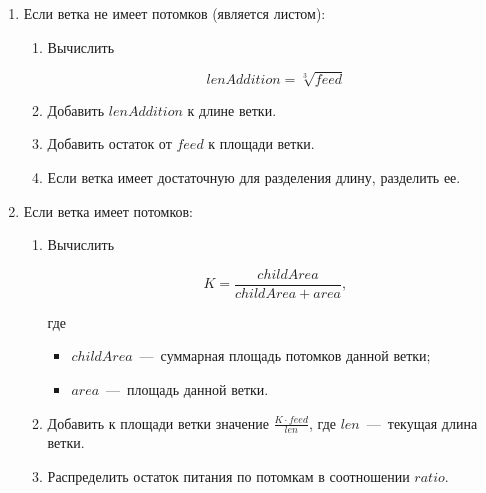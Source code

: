 \begin{enumerate}
	\item Если ветка не имеет потомков (является листом):
	\begin{enumerate}
		\item Вычислить
		
		\begin{equation}
		lenAddition = \sqrt[3]{feed}	
		\end{equation}
		
		\item Добавить $lenAddition$ к длине ветки.
		\item Добавить остаток от $feed$ к площади ветки.
		\item Если ветка имеет достаточную для разделения длину, разделить ее.

	\end{enumerate}
	
	\item Если ветка имеет потомков:
	
	\begin{enumerate}
		\item Вычислить
		
		\begin{equation}
		K = \frac{childArea}{childArea + area},
		\end{equation}
		
		где 
		
		\begin{itemize}
			\item $childArea$~---~суммарная площадь потомков данной ветки;
			\item $area$~---~площадь данной ветки.
		\end{itemize}
		
		\item Добавить к площади ветки значение $\frac{K \cdot feed}{len}$, где $len$~---~текущая длина ветки.
		\item Распределить остаток питания по потомкам в соотношении $ratio$.
		
		

	\end{enumerate}
\end{enumerate}


